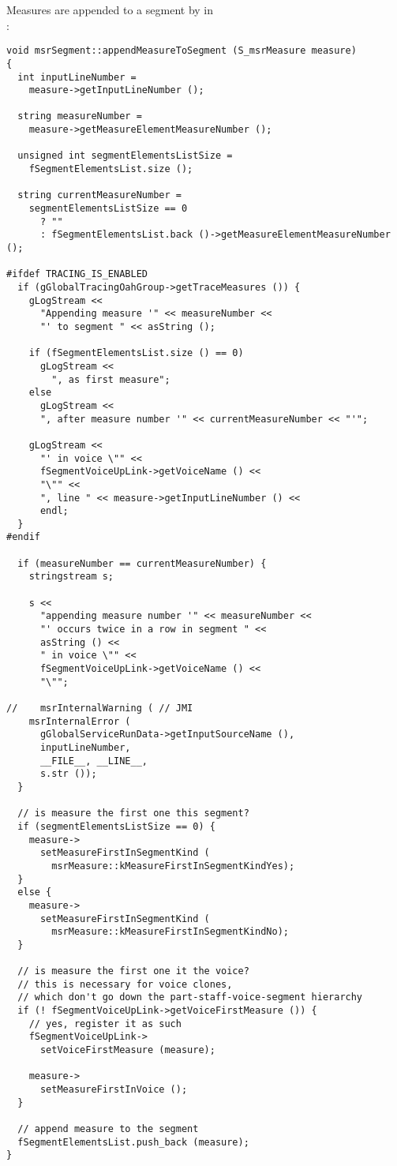 Measures are appended to a segment by  in \\:
\begin{lstlisting}[language=CPlusPlus]
void msrSegment::appendMeasureToSegment (S_msrMeasure measure)
{
  int inputLineNumber =
    measure->getInputLineNumber ();

  string measureNumber =
    measure->getMeasureElementMeasureNumber ();

  unsigned int segmentElementsListSize =
    fSegmentElementsList.size ();

  string currentMeasureNumber =
    segmentElementsListSize == 0
      ? ""
      : fSegmentElementsList.back ()->getMeasureElementMeasureNumber ();

#ifdef TRACING_IS_ENABLED
  if (gGlobalTracingOahGroup->getTraceMeasures ()) {
    gLogStream <<
      "Appending measure '" << measureNumber <<
      "' to segment " << asString ();

    if (fSegmentElementsList.size () == 0)
      gLogStream <<
        ", as first measure";
    else
      gLogStream <<
      ", after measure number '" << currentMeasureNumber << "'";

    gLogStream <<
      "' in voice \"" <<
      fSegmentVoiceUpLink->getVoiceName () <<
      "\"" <<
      ", line " << measure->getInputLineNumber () <<
      endl;
  }
#endif

  if (measureNumber == currentMeasureNumber) {
    stringstream s;

    s <<
      "appending measure number '" << measureNumber <<
      "' occurs twice in a row in segment " <<
      asString () <<
      " in voice \"" <<
      fSegmentVoiceUpLink->getVoiceName () <<
      "\"";

//    msrInternalWarning ( // JMI
    msrInternalError (
      gGlobalServiceRunData->getInputSourceName (),
      inputLineNumber,
      __FILE__, __LINE__,
      s.str ());
  }

  // is measure the first one this segment?
  if (segmentElementsListSize == 0) {
    measure->
      setMeasureFirstInSegmentKind (
        msrMeasure::kMeasureFirstInSegmentKindYes);
  }
  else {
    measure->
      setMeasureFirstInSegmentKind (
        msrMeasure::kMeasureFirstInSegmentKindNo);
  }

  // is measure the first one it the voice?
  // this is necessary for voice clones,
  // which don't go down the part-staff-voice-segment hierarchy
  if (! fSegmentVoiceUpLink->getVoiceFirstMeasure ()) {
    // yes, register it as such
    fSegmentVoiceUpLink->
      setVoiceFirstMeasure (measure);

    measure->
      setMeasureFirstInVoice ();
  }

  // append measure to the segment
  fSegmentElementsList.push_back (measure);
}
\end{lstlisting}

